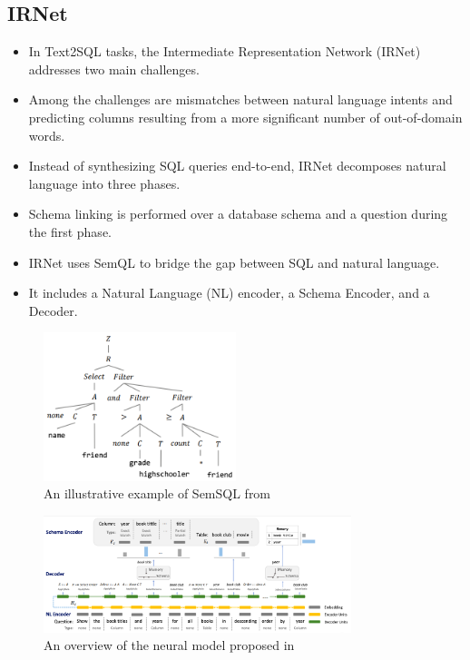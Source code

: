 \subsection{IRNet}

\begin{itemize}
    \item In Text2SQL tasks, the Intermediate Representation Network (IRNet) addresses two main challenges.
    \item Among the challenges are mismatches between natural language intents and predicting columns resulting from a more significant number of out-of-domain words.
    \item Instead of synthesizing SQL queries end-to-end, IRNet decomposes natural language into three phases.
    \item Schema linking is performed over a database schema and a question during the first phase.
    \item IRNet uses SemQL to bridge the gap between SQL and natural language.
    \item It includes a Natural Language (NL) encoder, a Schema Encoder, and a Decoder.
\end{itemize}

\begin{figure}[htb]
    \centering
    \includegraphics[width=0.5\textwidth]{pics/IRNet/illustrative_SemSQL}
    \caption{An illustrative example of SemSQL from \cite{DBLP:journals/corr/abs-1905-08205}}
    \label{fig:illustrative_SemSQL}
\end{figure}

\begin{figure}[htb]
    \centering
    \includegraphics[width=0.8\textwidth]{pics/IRNet/overview}
    \caption{An overview of the neural model proposed in \cite{DBLP:journals/corr/abs-1905-08205}}
    \label{fig:overview}
\end{figure}


